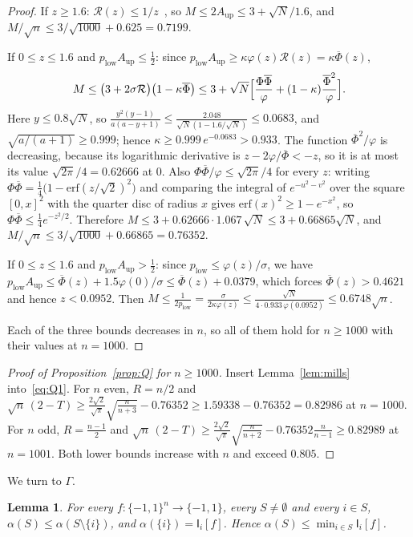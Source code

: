 \documentclass[11pt]{amsart}
\newtheorem{lemma}{Lemma}[section]
\theoremstyle{remark}
\newcommand{\bits}{\{-1,1\}}
\newcommand{\I}{\mathsf I}
\newcommand{\Phib}{\overline{\Phi}}
\begin{document}
\begin{proof}
If $z\ge1.6$: $\mathcal R(z)\le1/z$~\cite{Gor41}, so $M\le2A_{\mathrm{up}}\le3+\sqrt N/1.6$, and $M/\sqrt n\le3/\sqrt{1000}+0.625=0.7199$.

If $0\le z\le1.6$ and $p_{\mathrm{low}}A_{\mathrm{up}}\le\frac12$: since $p_{\mathrm{low}}A_{\mathrm{up}}\ge\kappa\varphi(z)\mathcal R(z)=\kappa\Phib(z)$,
\[
 M\le\bigl(3+2\sigma\mathcal R\bigr)\bigl(1-\kappa\Phib\bigr)\le3+\sqrt N\Bigl[\frac{\Phi\Phib}{\varphi}+(1-\kappa)\frac{\Phib^2}{\varphi}\Bigr].
\]
Here $y\le0.8\sqrt N$, so $\frac{y^2(y-1)}{a(a-y+1)}\le\frac{2.048}{\sqrt N(1-1.6/\sqrt N)}\le0.0683$, and $\sqrt{a/(a+1)}\ge0.999$; hence $\kappa\ge0.999\,e^{-0.0683}>0.933$. The function $\Phib^2/\varphi$ is decreasing, because its logarithmic derivative is $z-2\varphi/\Phib<-z$, so it is at most its value $\sqrt{2\pi}/4=0.62666$ at $0$. Also $\Phi\Phib/\varphi\le\sqrt{2\pi}/4$ for every $z$: writing $\Phi\Phib=\frac14\bigl(1-\mathrm{erf}(z/\sqrt2)^2\bigr)$ and comparing the integral of $e^{-u^2-v^2}$ over the square $[0,x]^2$ with the quarter disc of radius $x$ gives $\mathrm{erf}(x)^2\ge1-e^{-x^2}$, so $\Phi\Phib\le\frac14e^{-z^2/2}$. Therefore $M\le3+0.62666\cdot1.067\,\sqrt N\le3+0.66865\sqrt N$, and $M/\sqrt n\le3/\sqrt{1000}+0.66865=0.76352$.

If $0\le z\le1.6$ and $p_{\mathrm{low}}A_{\mathrm{up}}>\frac12$: since $p_{\mathrm{low}}\le\varphi(z)/\sigma$, we have $p_{\mathrm{low}}A_{\mathrm{up}}\le\Phib(z)+1.5\varphi(0)/\sigma\le\Phib(z)+0.0379$, which forces $\Phib(z)>0.4621$ and hence $z<0.0952$. Then $M\le\frac1{2p_{\mathrm{low}}}=\frac{\sigma}{2\kappa\varphi(z)}\le\frac{\sqrt N}{4\cdot0.933\,\varphi(0.0952)}\le0.6748\sqrt n$.

Each of the three bounds decreases in $n$, so all of them hold for $n\ge1000$ with their values at $n=1000$.
\end{proof}

\begin{proof}[Proof of Proposition~\ref{prop:Q} for $n\ge1000$]
Insert Lemma~\ref{lem:mills} into~\eqref{eq:Q1}. For $n$ even, $R=n/2$ and $\sqrt n\,(2-T)\ge\frac{2\sqrt2}{\sqrt\pi}\sqrt{\frac n{n+3}}-0.76352\ge1.59338-0.76352=0.82986$ at $n=1000$. For $n$ odd, $R=\frac{n-1}2$ and $\sqrt n\,(2-T)\ge\frac{2\sqrt2}{\sqrt\pi}\sqrt{\frac n{n+2}}-0.76352\frac n{n-1}\ge0.82989$ at $n=1001$. Both lower bounds increase with $n$ and exceed $0.805$.
\end{proof}

We turn to $\Gamma$.

\begin{lemma}\label{lem:alpha}
For every $f:\bits^n\to\bits$, every $S\ne\emptyset$ and every $i\in S$, $\alpha(S)\le\alpha(S\setminus\{i\})$, and $\alpha(\{i\})=\I_i[f]$. Hence $\alpha(S)\le\min_{i\in S}\I_i[f]$.
\end{lemma}
\end{document}
